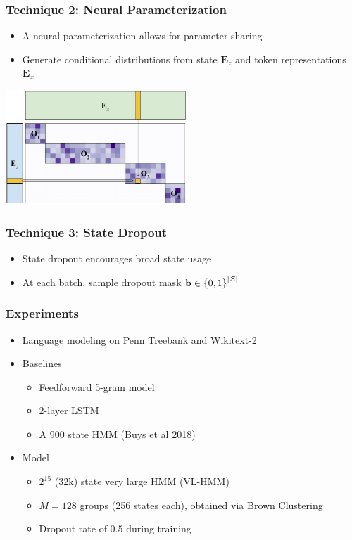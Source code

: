 \documentclass{beamer}
\begin{document}
\begin{frame}
\frametitle{Technique 2: Neural Parameterization}
\begin{itemize}
\item A neural parameterization allows for parameter sharing
\item Generate conditional distributions from
state $\mathbf{E}_z$ and token representations $\mathbf{E}_x$
\end{itemize}
\begin{center}
\includegraphics[height=1.7in]{img/blocksparse_mat_no_block.pdf}
\end{center}
\end{frame}

\begin{frame}
\frametitle{Technique 3: State Dropout}
\begin{itemize}
\item State dropout encourages broad state usage
\item At each batch, sample dropout mask $\mathbf{b} \in \left\{0,1\right\}^{|\mathcal{Z}|}$
\end{itemize}
\begin{center}
\resizebox{0.75\width}{0.75\height}{

}
\end{center}
\end{frame}

\begin{frame}
\frametitle{Experiments}
\begin{itemize}
\item Language modeling on Penn Treebank and Wikitext-2
\vspace{1em}
\item Baselines
    \begin{itemize}
    \item Feedforward 5-gram model
    \item 2-layer LSTM
    \item A 900 state HMM (Buys et al 2018)
    \end{itemize}
\vspace{1em}
\item Model
    \begin{itemize}
    \item $2^{15}$ (32k) state very large HMM (VL-HMM)
    \item $M=128$ groups (256 states each), obtained via Brown Clustering
    \item Dropout rate of $0.5$ during training
    \end{itemize}
\end{itemize}
\end{frame}
\end{document}

